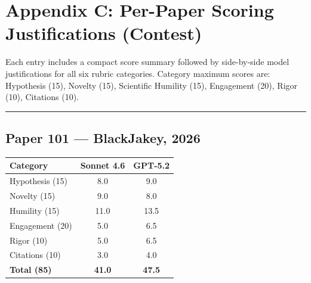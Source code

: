 \documentclass[11pt]{article}
\begin{document}
 
\section*{Appendix C: Per-Paper Scoring Justifications (Contest)}
 
Each entry includes a compact score summary followed by side-by-side model justifications
for all six rubric categories. Category maximum scores are: Hypothesis (15), Novelty (15),
Scientific Humility (15), Engagement (20), Rigor (10), Citations (10).
 
\tableofcontents
 
\bigskip
\hrule
\bigskip

\subsection*{Paper 101 --- BlackJakey, 2026}

\medskip

\begin{tabular}{lcc}
\toprule
\textbf{Category} & \textbf{Sonnet 4.6} & \textbf{GPT-5.2} \\
\midrule
Hypothesis (15) & 8.0 & 9.0 \\
Novelty (15) & 9.0 & 8.0 \\
Humility (15) & 11.0 & 13.5 \\
Engagement (20) & 5.0 & 6.5 \\
Rigor (10) & 5.0 & 6.5 \\
Citations (10) & 3.0 & 4.0 \\
\midrule
\textbf{Total (85)} & \textbf{41.0} & \textbf{47.5} \\
\bottomrule
\end{tabular}

\bigskip
\end{document}

